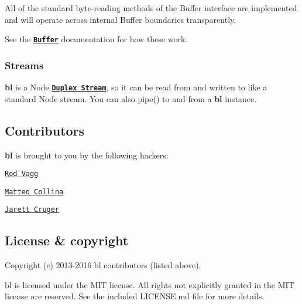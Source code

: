 All of the standard byte-\/reading methods of the {\ttfamily Buffer} interface are implemented and will operate across internal Buffer boundaries transparently.

See the {\bfseries {\ttfamily \href{http://nodejs.org/docs/latest/api/buffer.html}{\tt Buffer}}} documentation for how these work. 

 \label{_streams}%
 \subsubsection*{Streams}

{\bfseries bl} is a Node {\bfseries \href{http://nodejs.org/docs/latest/api/stream.html#stream_class_stream_duplex}{\tt Duplex Stream}}, so it can be read from and written to like a standard Node stream. You can also {\ttfamily pipe()} to and from a {\bfseries bl} instance. 



\subsection*{Contributors}

{\bfseries bl} is brought to you by the following hackers\+:


\begin{DoxyItemize}
\item \href{https://github.com/rvagg}{\tt Rod Vagg}
\item \href{https://github.com/mcollina}{\tt Matteo Collina}
\item \href{https://github.com/jcrugzz}{\tt Jarett Cruger} 


\end{DoxyItemize}

\label{_license}%
 \subsection*{License \& copyright}

Copyright (c) 2013-\/2016 bl contributors (listed above).

bl is licensed under the M\+IT license. All rights not explicitly granted in the M\+IT license are reserved. See the included L\+I\+C\+E\+N\+S\+E.\+md file for more details. 